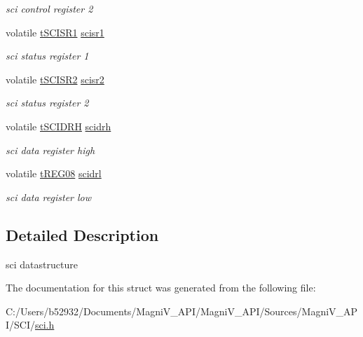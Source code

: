 \begin{DoxyCompactItemize}
\begin{DoxyCompactList}\small\item\em sci control register 2 \end{DoxyCompactList}\item 
\hypertarget{structt_s_c_i_af60d34420c507e92ef48be42f7fd7b6b}{}volatile \hyperlink{unionu_s_c_i_s_r1}{t\+S\+C\+I\+S\+R1} \hyperlink{structt_s_c_i_af60d34420c507e92ef48be42f7fd7b6b}{scisr1}\label{structt_s_c_i_af60d34420c507e92ef48be42f7fd7b6b}

\begin{DoxyCompactList}\small\item\em sci status register 1 \end{DoxyCompactList}\item 
\hypertarget{structt_s_c_i_a7aa91e32d5499736d8d04f6249b88719}{}volatile \hyperlink{unionu_s_c_i_s_r2}{t\+S\+C\+I\+S\+R2} \hyperlink{structt_s_c_i_a7aa91e32d5499736d8d04f6249b88719}{scisr2}\label{structt_s_c_i_a7aa91e32d5499736d8d04f6249b88719}

\begin{DoxyCompactList}\small\item\em sci status register 2 \end{DoxyCompactList}\item 
\hypertarget{structt_s_c_i_a3d281c95143a05fbee86b8ff50cc3a18}{}volatile \hyperlink{unionu_s_c_i_d_r_h}{t\+S\+C\+I\+D\+R\+H} \hyperlink{structt_s_c_i_a3d281c95143a05fbee86b8ff50cc3a18}{scidrh}\label{structt_s_c_i_a3d281c95143a05fbee86b8ff50cc3a18}

\begin{DoxyCompactList}\small\item\em sci data register high \end{DoxyCompactList}\item 
\hypertarget{structt_s_c_i_a4353973b931c5b08e7360758eb1a1800}{}volatile \hyperlink{unionu_r_e_g08}{t\+R\+E\+G08} \hyperlink{structt_s_c_i_a4353973b931c5b08e7360758eb1a1800}{scidrl}\label{structt_s_c_i_a4353973b931c5b08e7360758eb1a1800}

\begin{DoxyCompactList}\small\item\em sci data register low \end{DoxyCompactList}\end{DoxyCompactItemize}


\subsection{Detailed Description}
sci datastructure 

The documentation for this struct was generated from the following file\+:\begin{DoxyCompactItemize}
\item 
C\+:/\+Users/b52932/\+Documents/\+Magni\+V\+\_\+\+A\+P\+I/\+Magni\+V\+\_\+\+A\+P\+I/\+Sources/\+Magni\+V\+\_\+\+A\+P\+I/\+S\+C\+I/\hyperlink{sci_8h}{sci.\+h}\end{DoxyCompactItemize}
